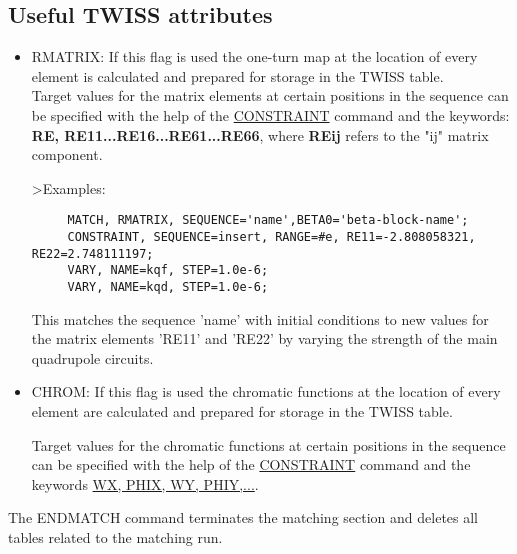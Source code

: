 \subsection{Useful TWISS attributes}

\begin{itemize}
\item RMATRIX: If this flag is used the one-turn map at the location of every
  element is calculated and prepared for storage in the TWISS table.\\ 
  Target values for the matrix elements at certain positions in the sequence
  can be specified with the help of the \href{match_con.html#constraint}{CONSTRAINT}
  command and the
  keywords: \textbf{RE, RE11...RE16...RE61...RE66}, where \textbf{REij} refers
  to the "ij" matrix component.
  
  \textgreater Examples:
 
\begin{verbatim}
     MATCH, RMATRIX, SEQUENCE='name',BETA0='beta-block-name';
     CONSTRAINT, SEQUENCE=insert, RANGE=#e, RE11=-2.808058321, RE22=2.748111197;
     VARY, NAME=kqf, STEP=1.0e-6;
     VARY, NAME=kqd, STEP=1.0e-6;
\end{verbatim}

  This matches the sequence 'name' with initial conditions to new values
  for the matrix elements 'RE11' and 'RE22' by varying the strength of the
  main quadrupole circuits.

\item CHROM: If this flag is used the chromatic functions at the location of
  every element are calculated and prepared for storage in the TWISS
  table. 
  
  Target values for the chromatic functions at certain positions in the
  sequence can be specified with the help of the
  \href{match_con.html#constraint}{CONSTRAINT} command and the keywords
  \href{../Introduction/tables.html#normal}{WX, PHIX, WY, PHIY,...}. 
\end{itemize}

 
The ENDMATCH command terminates the matching section and deletes all
tables related to the matching run. 





%
 
